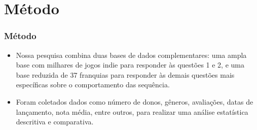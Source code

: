 \section{Método}
\begin{frame}
\frametitle{Método}
\justifying

\begin{itemize}
    \item  Nossa pesquisa combina duas bases de dados complementares:
    uma ampla base com milhares de jogos indie para responder
    às questões 1 e 2, e uma base reduzida de 37 franquias
    para responder às demais questões mais específicas sobre o
    comportamento das sequência.
    \vspace{0.2cm}

    \item Foram coletados dados como número de donos, gêneros, avaliações, 
    datas de lançamento, nota média, entre outros, para realizar uma análise estatística descritiva e comparativa.
    \vspace{0.2cm}

\end{itemize}    
\end{frame}